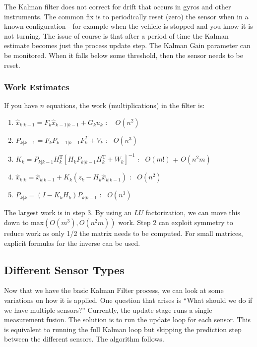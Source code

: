 The Kalman filter does not correct for drift that occurs in gyros and
other instruments. The common fix is to periodically reset (zero) the
sensor when in a known configuration - for example when the vehicle is
stopped and you know it is not turning. The issue of course is that
after a period of time the Kalman estimate becomes just the process
update step. The Kalman Gain parameter can be monitored. When it falls
below some threshold, then the sensor needs to be reset.

\hypertarget{work-estimates}{%
\subsubsection{Work Estimates}\label{work-estimates}}

If you have \(n\) equations, the work (multiplications) in the filter
is:

\begin{enumerate}
\tightlist
\item
  \(\hat{x}_{k|k-1} = F_{k}\hat{x}_{k-1|k-1} + G_{k} u_{k}\) : ~
  \(O(n^2)\)
\item
  \(P_{k|k-1} = F_{k} P_{k-1|k-1} F_{k}^{T} + V_{k}\) : ~\(O(n^3)\)
\item
  \(K_k = P_{k|k-1}H_k^\text{T}\left[ H_k P_{k|k-1} H_k^\text{T} + W_k  \right]^{-1}\)
  : ~\(O(m!)\) + \(O(n^2m)\)
\item
  \(\hat{x}_{k|k} =   \hat{x}_{k|k-1} + K_k \left(z_k - H_k\hat{x}_{k|k-1} \right)\)
  : ~\(O(n^2)\)
\item
  \(P_{k|k} =   (I - K_k H_k) P_{k|k-1}\) : ~\(O(n^3)\)
\end{enumerate}

The largest work is in step 3. By using an \(LU\) factorization, we can
move this down to \(\text{max}(O(m^3),O(n^2m))\) work. Step 2 can
exploit symmetry to reduce work as only 1/2 the matrix needs to be
computed. For small matrices, explicit formulas for the inverse can be
used.

\hypertarget{different-sensor-types}{%
\subsection{Different Sensor Types}\label{different-sensor-types}}

Now that we have the basic Kalman Filter process, we can look at some
variations on how it is applied. One question that arises is ``What
should we do if we have multiple sensors?'' Currently, the update stage
runs a single measurement fusion. The solution is to run the update loop
for each sensor. This is equivalent to running the full Kalman loop but
skipping the prediction step between the different sensors. The
algorithm follows.

